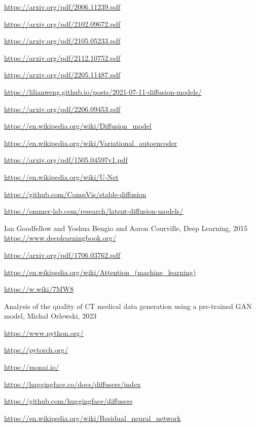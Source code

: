 \documentclass[11pt,a4paper]{report}
\begin{document}
\begin{thebibliography}{99}

\url{https://arxiv.org/pdf/2006.11239.pdf}

\url{https://arxiv.org/pdf/2102.09672.pdf}

\url{https://arxiv.org/pdf/2105.05233.pdf}

\url{https://arxiv.org/pdf/2112.10752.pdf}

\url{https://arxiv.org/pdf/2205.11487.pdf}
  
\url{ https://lilianweng.github.io/posts/2021-07-11-diffusion-models/}

\url{https://arxiv.org/pdf/2206.09453.pdf}

\url{https://en.wikipedia.org/wiki/Diffusion_model}

\url{https://en.wikipedia.org/wiki/Variational_autoencoder}

\url{https://arxiv.org/pdf/1505.04597v1.pdf}

\url{https://en.wikipedia.org/wiki/U-Net}

\url{https://github.com/CompVis/stable-diffusion}

\url{https://ommer-lab.com/research/latent-diffusion-models/}

Ian Goodfellow and Yoshua Bengio and Aaron Courville, Deep Learning, 2015
\url{https://www.deeplearningbook.org/}

\url{https://arxiv.org/pdf/1706.03762.pdf}

\url{https://en.wikipedia.org/wiki/Attention_(machine_learning)}

\url{https://w.wiki/7MW8}

Analysis of the quality of CT medical data generation using a pre-trained GAN model, Michał Orlewski, 2023

\url{https://www.python.org/}

\url{https://pytorch.org/}

\url{https://monai.io/}
  
\url{https://huggingface.co/docs/diffusers/index}

\url{https://github.com/huggingface/diffusers}

\url{https://en.wikipedia.org/wiki/Residual_neural_network}
  
\end{thebibliography}
\end{document}
